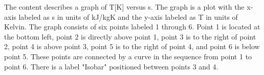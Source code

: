 The content describes a graph of T[K] versus s. The graph is a plot with the x-axis labeled as s in units of kJ/kgK and the y-axis labeled as T in units of Kelvin. The graph consists of six points labeled 1 through 6. Point 1 is located at the bottom left, point 2 is directly above point 1, point 3 is to the right of point 2, point 4 is above point 3, point 5 is to the right of point 4, and point 6 is below point 5. These points are connected by a curve in the sequence from point 1 to point 6. There is a label "Isobar" positioned between points 3 and 4.